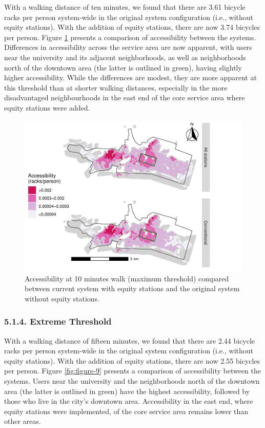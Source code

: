 \documentclass[]{elsarticle} %
\begin{document}
With a walking distance of ten minutes, we found that there are 3.61
bicycle racks per person system-wide in the original system
configuration (i.e., without equity stations). With the addition of
equity stations, there are now 3.74 bicycles per person. Figure
\ref{fig:figure-8} presents a comparison of accessibility between the
systems. Differences in accessibility across the service area are now
apparent, with users near the university and its adjacent neighborhoods,
as well as neighborhoods north of the downtown area (the latter is
outlined in green), having slightly higher accessibility. While the
differences are modest, they are more apparent at this threshold than at
shorter walking distances, especially in the more disadvantaged
neighbourhoods in the east end of the core service area where equity
stations were added.

\begin{figure}

{\centering \includegraphics[width=0.9\linewidth]{Bike-share-spatial-equity_files/figure-latex/figure-8-1} 

}

\caption{Accessibility at 10 minutes walk (maximum threshold) compared between current system with equity stations and the original system without equity stations.}\label{fig:figure-8}
\end{figure}

\hypertarget{extreme-threshold}{%
\subsubsection{5.1.4. Extreme Threshold}\label{extreme-threshold}}

With a walking distance of fifteen minutes, we found that there are 2.44
bicycle racks per person system-wide in the original system
configuration (i.e., without equity stations). With the addition of
equity stations, there are now 2.55 bicycles per person. Figure
\ref{fig:figure-9} presents a comparison of accessibility between the
systems. Users near the university and the neighborhoods north of the
downtown area (the latter is outlined in green) have the highest
accessibility, followed by those who live in the city's downtown area.
Accessibility in the east end, where equity stations were implemented,
of the core service area remains lower than other areas.
\end{document}
